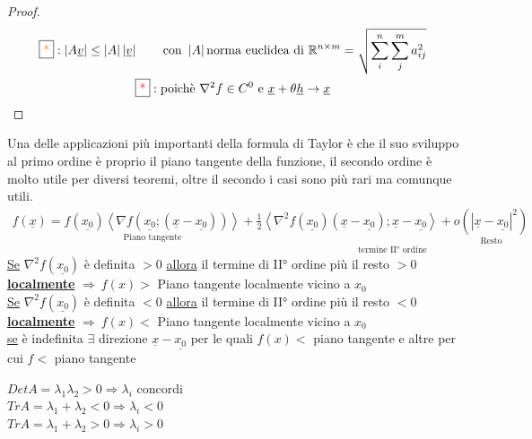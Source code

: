 \documentclass[a4paper, oneside]{article}
\begin{document}
\begin{proof}
\begin{gather*}
                \text{\fbox{\textcolor{orange}{*}}}: \left\lvert A \underline{v} \right\rvert \leq \left\lvert A \right\rvert \left\lvert \underline{v} \right\rvert \qquad \text{con }\left\lvert A \right\rvert \text{norma euclidea di }\mathbb{R}^{n\times m} =\sqrt{\sum_{i}^{n}\sum_{j}^{m} a^2_{ij} }   \\
                \text{\fbox{\textcolor{red}{*}}}: \text{poichè } \nabla^2f\in C^0 \text{ e } \underline{x} + \theta\underline{h} \to \underline{x}
            \end{gather*}
        \end{proof}
        \begin{proposition}
        Una delle applicazioni più importanti della formula di Taylor è che il suo sviluppo al primo ordine è proprio il piano tangente della funzione, il secondo ordine è molto utile per diversi teoremi, oltre il secondo i casi sono più rari ma comunque utili.
            \begin{gather*}
                f(\underline{x}) = \underset{\text{Piano tangente}}{f(\underline{x_0}) \left\langle \nabla f(\underline{x_0};(\underline{x} - \underline{x_0})) \right\rangle} + \underset{\text{termine II° ordine}}{\frac{1}{2} \left\langle \nabla^2 f(\underline{x_0})(\underline{x}- \underline{x_0}); \underline{x}- \underline{x_0}\right\rangle  + \underset{\text{Resto}}{o(| \underline{x}- \underline{x_0} |^2)}}
            \end{gather*}
            \underline{Se} $\nabla^2f(\underline{x_0})$ è definita $> 0$ \underline{allora} il termine di II° ordine più il resto $>0$ \underline{\textbf{localmente}} $\Rightarrow \ f(x) > $ Piano tangente localmente vicino a $x_0$\\
            \underline{Se} $\nabla^2f(\underline{x_0})$ è definita $< 0$ \underline{allora} il termine di II° ordine più il resto $<0$ \underline{\textbf{localmente}} $\Rightarrow \ f(x) < $ Piano tangente localmente vicino a $x_0$\\ 
            \underline{se} è indefinita $\exists $ direzione $\underline{x} - \underline{x_0}$ per le quali $f(x) < $ piano tangente e altre per cui $f < $ piano tangente\\
        \end{proposition}
                \begin{proposition}
            $Det A = \lambda_1 \lambda_2 > 0 \Rightarrow \lambda_i$ concordi\\
            $Tr A = \lambda_1 + \lambda_2 < 0 \Rightarrow \lambda_i< 0$\\
            $Tr A = \lambda_1 + \lambda_2 > 0 \Rightarrow \lambda_i> 0$\\ 
        \end{proposition}
\end{document}
